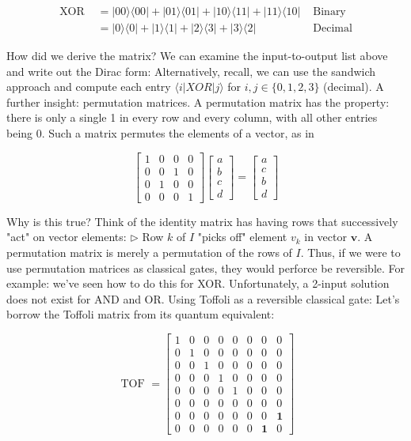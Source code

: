 \documentclass[main.tex]{subfiles}
\begin{document}
    $$
    \begin{aligned}
    \text { XOR } &=|00\rangle\langle 00|+| 01\rangle\langle 01|+| 10\rangle\langle 11|+| 11\rangle\langle 10| & \text { Binary } \\
    &=|0\rangle\langle 0|+| 1\rangle\langle 1|+| 2\rangle\langle 3|+| 3\rangle\langle 2| & \text { Decimal }
    \end{aligned}
    $$
    
    How did we derive the matrix? We can examine the input-to-output list above and write out the Dirac form: Alternatively, recall, we can use the sandwich approach and compute each entry $\langle i|X O R| j\rangle$ for $i, j \in\{0,1,2,3\}$ (decimal). A further insight: permutation matrices. A permutation matrix has the property: there is only a single 1 in every row and every column, with all other entries being 0. Such a matrix permutes the elements of a vector, as in
    
    $$
    \left[\begin{array}{llll}
    1 & 0 & 0 & 0 \\
    0 & 0 & 1 & 0 \\
    0 & 1 & 0 & 0 \\
    0 & 0 & 0 & 1
    \end{array}\right]\left[\begin{array}{l}
    a \\
    b \\
    c \\
    d
    \end{array}\right]=\left[\begin{array}{l}
    a \\
    c \\
    b \\
    d
    \end{array}\right]
    $$
    
    Why is this true? Think of the identity matrix has having rows that successively "act" on vector elements: $\triangleright$ Row $k$ of $I$ "picks off" element $v_{k}$ in vector $\mathbf{v}$. A permutation matrix is merely a permutation of the rows of $I$. Thus, if we were to use permutation matrices as classical gates, they would perforce be reversible. For example: we've seen how to do this for XOR. Unfortunately, a 2-input solution does not exist for AND and OR. Using Toffoli as a reversible classical gate: Let's borrow the Toffoli matrix from its quantum equivalent:
    
    $$
    \text { TOF }=\left[\begin{array}{llllllll}
    1 & 0 & 0 & 0 & 0 & 0 & 0 & 0 \\
    0 & 1 & 0 & 0 & 0 & 0 & 0 & 0 \\
    0 & 0 & 1 & 0 & 0 & 0 & 0 & 0 \\
    0 & 0 & 0 & 1 & 0 & 0 & 0 & 0 \\
    0 & 0 & 0 & 0 & 1 & 0 & 0 & 0 \\
    0 & 0 & 0 & 0 & 0 & 0 & 0 & 0 \\
    0 & 0 & 0 & 0 & 0 & 0 & 0 & \mathbf{1} \\
    0 & 0 & 0 & 0 & 0 & 0 & \mathbf{1} & 0
    \end{array}\right]
    $$
    
\end{document}
